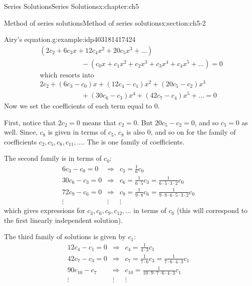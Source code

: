 \documentclass[oneside,10pt,]{book}
\numberwithin{equation}{section}
\numberwithin{equation}{section}
\newcommand{\amp}{&}
\begin{document}
\begin{chapterptx}{Series Solutions}{}{Series Solutions}{}{}{x:chapter:ch5}
\begin{sectionptx}{Method of series solutions}{}{Method of series solutions}{}{}{x:section:ch5-2}
\begin{example}{Airy's equation.}{g:example:idp403181417424}
\begin{align*}
\amp(2c_2 + 6c_3 x + 12 c_4 x^2 + 20c_5 x^3 + \ldots)\\
\amp\hspace{1in} - (c_0 x + c_1 x^2 + c_2 x^3 + c_3 x^4 + c_4 x^5 + \ldots) = 0\\
\amp\text{which resorts into}\\
\amp2c_2 + (6c_3 - c_0)x + (12c_4 - c_1)x^2 + (20c_5 - c_2)x^3 \\
\amp\hspace{1in}+ (30c_6 - c_3)x^4 + (42c_7 - c_4)x^5 + \ldots = 0
\end{align*}
Now we set the coefficients of each term equal to 0.%
\par
First, notice that \(2c_2 =0\) means that \(c_2 = 0\). But \(20c_5 - c_2 = 0\), and so \(c_5 =0\) as well. Since, \(c_8\) is given in terms of \(c_5\), \(c_8\) is also 0, and so on for the family of coefficients \(c_2, c_5, c_8, c_{11}, \ldots\). The is one family of coefficients.%
\par
The second family is in terms of \(c_0\):%
\begin{equation*}
\begin{array}{ccc}
6c_3 - c_0 = 0 \amp \Rightarrow \amp c_3 = \frac{1}{6} c_0 \\
30 c_6 - c_3 = 0 \amp \Rightarrow \amp c_6 = \frac{1}{6\cdot 5} c_3 = \frac{1}{6\cdot5\cdot3\cdot2} c_0 \\
72 c_9 - c_6 = 0 \amp \Rightarrow \amp c_9 = \frac{1}{9\cdot 8} c_6 = \frac{1}{9\cdot8\cdot6\cdot5\cdot3\cdot2}c_0\\
\vdots \amp \vdots \amp \vdots
\end{array}
\end{equation*}
which gives expressions for \(c_3, c_6, c_9, c_12, \ldots\) in terms of \(c_0\) (this will correspond to the first linearly independent solution).%
\par
The third family of solutions is given by \(c_1\):%
\begin{equation*}
\begin{array}{ccc}
12c_4 - c_1 = 0 \amp \Rightarrow \amp c_4 = \frac{1}{4\cdot3}c_1 \\
42c_7 - c_3 = 0 \amp \Rightarrow \amp c_7 = \frac{1}{7\cdot6}c_3 = \frac{1}{7\cdot6\cdot4\cdot3}c_1 \\
90c_{10} -  c_7 \amp \Rightarrow \amp c_{10} = \frac{1}{10\cdot9\cdot 7\cdot6\cdot 4\cdot3}c_1 \\
\vdots \amp \vdots \amp \vdots
\end{array}
\end{equation*}

\end{example}
\end{sectionptx}
\end{chapterptx}
\end{document}
